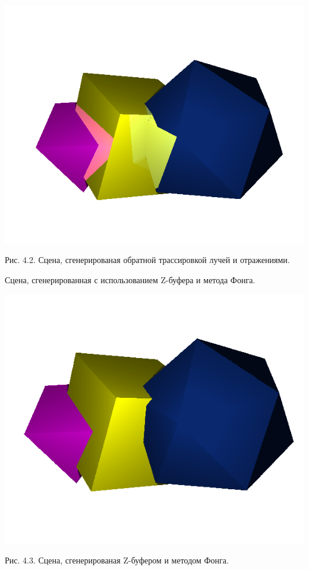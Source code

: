 \documentclass[12pt]{report}
\begin{document}
	\begin{center}
		\includegraphics[scale=0.8]{rto.png}
		
		Рис. 4.2. Сцена, сгенерированая обратной трассировкой лучей и отражениями.
	\end{center}

	Сцена, сгенерированная с использованием Z-буфера и метода Фонга.

	\begin{center}
		\includegraphics[scale=0.8]{gph.png}
		
		Рис. 4.3. Сцена, сгенерированая Z-буфером и методом Фонга.
	\end{center}
\end{document}
